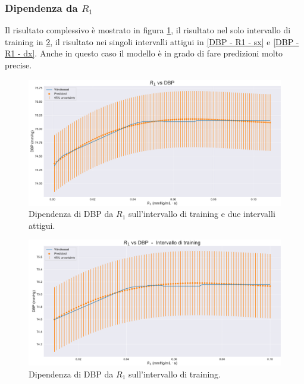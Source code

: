 \newpage

\subsubsection{Dipendenza da $R_1$}
Il risultato complessivo è mostrato in figura \ref{DBP - R1 - full}, il risultato nel solo intervallo di training in \ref{DBP - R1 - training}, il risultato nei singoli intervalli attigui in \ref{DBP - R1 - sx} e \ref{DBP - R1 - dx}. Anche in questo caso il modello è in grado di fare predizioni molto precise.

\vspace{1cm}

\begin{figure}[!htb]
    \centering
    \includegraphics[width=1\textwidth]{images/Training (risultati)/DBP/DBP - R1 - full.pdf}
    \caption{Dipendenza di DBP da $R_1$ sull'intervallo di training e due intervalli attigui.}
    \label{DBP - R1 - full}
\end{figure}

\vspace{0.32cm}

\begin{figure}[!htb]
    \centering
    \includegraphics[width=1\textwidth]{images/Training (risultati)/DBP/DBP - R1 - training.pdf}
    \caption{Dipendenza di DBP da $R_1$ sull'intervallo di training.}
    \label{DBP - R1 - training}
\end{figure}

